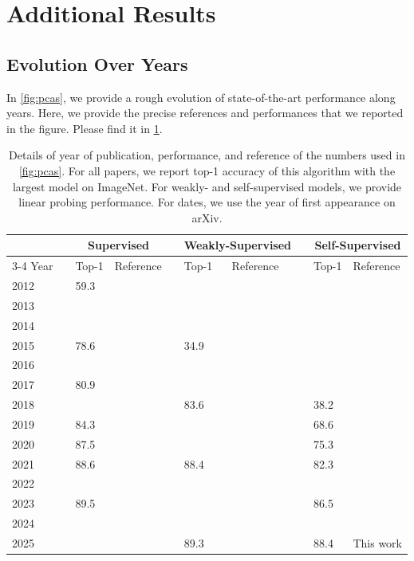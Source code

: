 \section{Additional Results}

\subsection{Evolution Over Years}
In \cref{fig:pcas}, we provide a rough evolution of state-of-the-art performance along years. 
Here, we provide the precise references and performances that we reported in the figure.
Please find it in \cref{app:fig:refs}.

\begin{table}[t]
    \centering
    \small
  \caption{
    Details of year of publication, performance, and reference of the numbers used in \cref{fig:pcas}.
    For all papers, we report top-1 accuracy of this algorithm with the largest model on ImageNet.
    For weakly- and self-supervised models, we provide linear probing performance.
    For dates, we use the year of first appearance on arXiv.
  }
  \label{app:fig:refs}
  \begin{tabular}{@{}l c ll c ll c ll@{}}
        \toprule
        && \multicolumn{2}{c}{Supervised} && \multicolumn{2}{c}{Weakly-Supervised} && \multicolumn{2}{c}{Self-Supervised} \\
        \cmidrule{3-4} \cmidrule{6-7} \cmidrule{9-10}
        Year && Top-1 & Reference && Top-1 & Reference && Top-1 & Reference \\
        \midrule
        2012 && 59.3 & \citet{krizhevsky2012imagenet} && \\
        2013 \\ 
        2014 \\
        2015 && 78.6 & \citet{he2016deep} && 34.9 & \citet{joulin2016learning} \\
        2016 \\
        2017 && 80.9 & \citet{xie2017aggregated} && \\
        2018 &&  & && 83.6 & \citet{mahajan2018exploring} && 38.2 & \citet{caron2018deep} \\
        2019 && 84.3 & \citet{tan2019efficientnet} && & && 68.6 & \citet{he2020momentum} \\
        2020 && 87.5 & \citet{kolesnikov2020big} &&  & && 75.3 & \citet{caron2020unsupervised} \\
        2021 && 88.6 & \citet{dosovitskiy2020image} && 88.4 & \citet{radford2021learning} && 82.3 & \citet{zhou2021ibot} \\
        2022 && \\
        2023 && 89.5 & \citet{dehghani2023scaling} && & && 86.5 & \citet{oquab2024dinov2} \\
        2024 && \\
        2025 &&  & && 89.3 & \citet{bolya2025perception} && 88.4 & This work \\
        \bottomrule
  \end{tabular}
  \vspace{3em}
\end{table}

